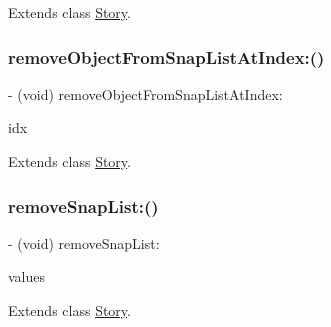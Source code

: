 Extends class \hyperlink{interface_story_a84a4bc73fd231a323da10244fa876157}{Story}.

\hypertarget{category_story_07_core_data_generated_accessors_08_a2862a1453b5d1ec4410421feed5acfdd}{}\label{category_story_07_core_data_generated_accessors_08_a2862a1453b5d1ec4410421feed5acfdd} 
\subsubsection{\texorpdfstring{remove\+Object\+From\+Snap\+List\+At\+Index\+:()}{removeObjectFromSnapListAtIndex:()}}
{\footnotesize\ttfamily -\/ (void) remove\+Object\+From\+Snap\+List\+At\+Index\+: \begin{DoxyParamCaption}\item[{(N\+S\+U\+Integer)}]{idx }\end{DoxyParamCaption}}



Extends class \hyperlink{interface_story_a2862a1453b5d1ec4410421feed5acfdd}{Story}.

\hypertarget{category_story_07_core_data_generated_accessors_08_a0d250a043b1896262bc08562ef7e889a}{}\label{category_story_07_core_data_generated_accessors_08_a0d250a043b1896262bc08562ef7e889a} 
\subsubsection{\texorpdfstring{remove\+Snap\+List\+:()}{removeSnapList:()}}
{\footnotesize\ttfamily -\/ (void) remove\+Snap\+List\+: \begin{DoxyParamCaption}\item[{(N\+S\+Ordered\+Set$<$ \hyperlink{interface_snap}{Snap} $\ast$ $>$ $\ast$)}]{values }\end{DoxyParamCaption}}



Extends class \hyperlink{interface_story_a0d250a043b1896262bc08562ef7e889a}{Story}.

